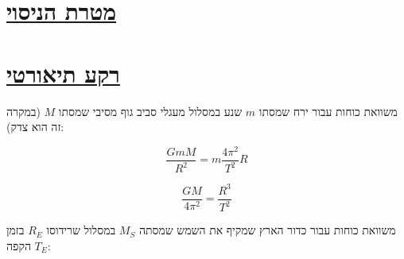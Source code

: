 \documentclass[a4paper, 12pt]{article}
\begin{document}
    {\makeatletter
        \def\@@underline#1{#1}
        \tableofcontents
    \makeatother} %

    \pagebreak 

    \section{\underline{מטרת הניסוי}}
    \begin{spacing}{1.15}
        \begin{flushright}

        \end{flushright}
    \end{spacing}


    \begin{figure}[h!]
        
    \end{figure}

    \pagebreak 

    \section{\underline{רקע תיאורטי}}
    \begin{spacing}{1.15}
        \begin{flushright}
            משוואת כוחות עבור ירח שמסתו $m$ שנע במסלול מעגלי סביב גוף מסיבי שמסתו $M$ (במקרה זה הוא צדק):
        \end{flushright}
    \end{spacing}

    \begin{english}
        $$ \dfrac{GmM}{R^2} = m\dfrac{4\pi^2}{T^2}R $$

        \begin{equation}
            \label{firsteq}
            \dfrac{GM}{4\pi^2} = \dfrac{R^3}{T^2}
        \end{equation}
    \end{english}

    \begin{spacing}{1.15}
        \begin{flushright}
            משוואת כוחות עבור כדור הארץ שמקיף את השמש שמסתה $M_S$ במסלול שרידוסו
            $R_E$ בזמן הקפה $T_E$:
        \end{flushright}
    \end{spacing}
\end{document}
